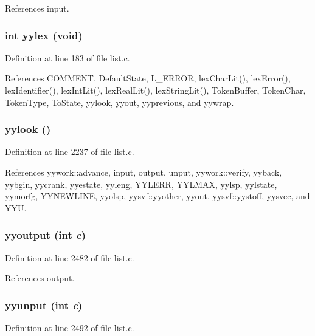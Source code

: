 References input.
\subsubsection{\setlength{\rightskip}{0pt plus 5cm}int yylex (void)}\label{list_8c_a40b27ae32d6d1ae7160bd6256e08eb8}




Definition at line 183 of file list.c.

References COMMENT, Default\-State, L\_\-ERROR, lex\-Char\-Lit(), lex\-Error(), lex\-Identifier(), lex\-Int\-Lit(), lex\-Real\-Lit(), lex\-String\-Lit(), Token\-Buffer, Token\-Char, Token\-Type, To\-State, yylook, yyout, yyprevious, and yywrap.
\subsubsection{\setlength{\rightskip}{0pt plus 5cm}yylook ()}\label{list_8c_81f50fcab7a210c90eb561a3ebeb3b52}




Definition at line 2237 of file list.c.

References yywork::advance, input, output, unput, yywork::verify, yyback, yybgin, yycrank, yyestate, yyleng, YYLERR, YYLMAX, yylsp, yylstate, yymorfg, YYNEWLINE, yyolsp, yysvf::yyother, yyout, yysvf::yystoff, yysvec, and YYU.
\subsubsection{\setlength{\rightskip}{0pt plus 5cm}yyoutput (int {\em c})}\label{list_8c_83bc497bbfffab9fd911e1f1262fb342}




Definition at line 2482 of file list.c.

References output.
\subsubsection{\setlength{\rightskip}{0pt plus 5cm}yyunput (int {\em c})}\label{list_8c_76ac9a27c10c26d1c6ed0d61caf1251f}




Definition at line 2492 of file list.c.

